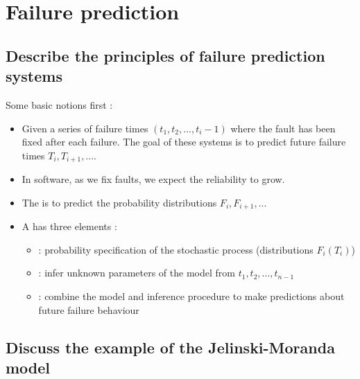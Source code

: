 \chapter{Failure prediction}

\section{Describe the principles of failure prediction systems}

Some basic notions first :
\begin{itemize}
    \item Given a series of failure times $(t_1, t_2, ..., t_i-1)$ where the fault has been fixed after each failure. The goal of these systems is to predict future failure times $T_i, T_{i+1},....$
    \item In software, as we fix faults, we expect the reliability to grow.
    \item The  is to predict the probability distributions $F_i, F_{i+1},...$
    \item A  has three elements :
    \begin{itemize}
        \item {} : probability specification of the stochastic process (distributions $F_i(T_i)$)
        \item {} : infer unknown parameters of the model from $t_1, t_2, ..., t_{n-1}$
        \item {} : combine the model and inference procedure to make predictions about future failure behaviour
    \end{itemize}
\end{itemize}

\section{Discuss the example of the Jelinski-Moranda model}

